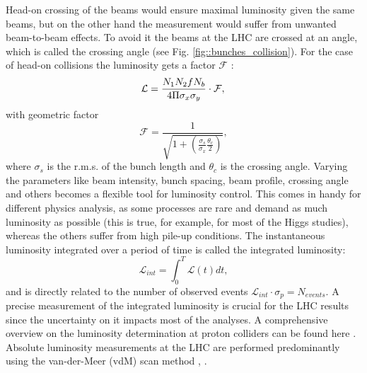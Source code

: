 	Head-on crossing of the beams would ensure maximal luminosity given the same beams, but on the other hand the measurement would suffer from unwanted beam-to-beam effects. To avoid it the beams at the LHC are crossed at an angle, which is called the crossing angle (see Fig. \ref{fig::bunches_collision}). 
	For the case of head-on collisions the luminosity gets a factor $\mathcal{F} $ \cite{Lumi}:
	\begin{equation}
	\mathcal{L} = \frac{N_1N_2fN_b}{4\Pi \sigma_x \sigma_y} \cdot \mathcal{F},\\
	\end{equation}
	with geometric factor
	\begin{equation}
	\nonumber
	\mathcal{F} = \frac{1}{\sqrt{ 1+\left(  \frac{\sigma_s}{\sigma_x}  \frac{\theta_c}{2} \right) }},
	\end{equation}
	where $\sigma_s$ is the r.m.s. of the bunch length and $\theta_c$ is the crossing angle. Varying the parameters like beam intensity, bunch spacing, beam profile, crossing angle and others becomes a flexible tool for luminosity control. This comes in handy for different physics analysis, as some processes are rare and demand as much luminosity as possible (this is true, for example, for most of the Higgs studies), whereas the others suffer from high pile-up conditions.
	The instantaneous luminosity integrated over a period of time is called the integrated luminosity:
	\begin{equation}
	\mathcal{L}_{int} = \int_0^{T} \mathcal{L}(t) dt,
	\end{equation}
	and is directly related to the number of observed events $\mathcal{L}_{int} \cdot \sigma_p = N_{events}$. A precise measurement of the integrated luminosity is crucial for the LHC results since the uncertainty on it impacts most of the analyses. A comprehensive overview on the luminosity determination at proton colliders can be found here \cite{lumi_witold}. Absolute luminosity measurements at the LHC are performed predominantly using the van-der-Meer (vdM) scan method \cite{vdm1}, \cite{vdm2}. 
	
